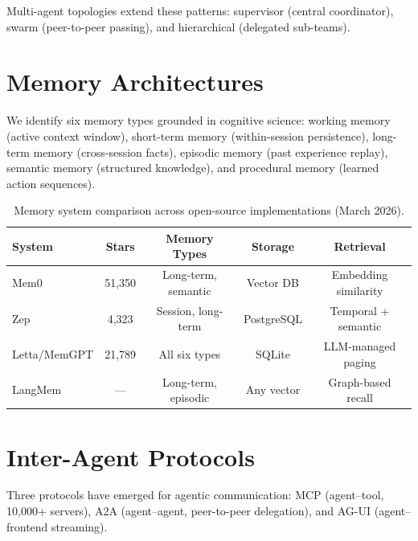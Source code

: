 \documentclass[sn-basic]{sn-jnl}
\theoremstyle{definition}
\begin{document}
Multi-agent topologies extend these patterns: supervisor (central coordinator), swarm (peer-to-peer passing), and hierarchical (delegated sub-teams).

\section{Memory Architectures}\label{sec:memory}

We identify six memory types grounded in cognitive science: working memory (active context window), short-term memory (within-session persistence), long-term memory (cross-session facts), episodic memory (past experience replay), semantic memory (structured knowledge), and procedural memory (learned action sequences).

\begin{table}[ht]
\centering
\caption{Memory system comparison across open-source implementations (March 2026).}
\label{tab:memory}
\begin{tabular}{lcccc}
\toprule
\textbf{System} & \textbf{Stars} & \textbf{Memory Types} & \textbf{Storage} & \textbf{Retrieval} \\
\midrule
Mem0         & 51,350 & Long-term, semantic  & Vector DB  & Embedding similarity \\
Zep          & 4,323  & Session, long-term   & PostgreSQL & Temporal + semantic \\
Letta/MemGPT & 21,789 & All six types        & SQLite     & LLM-managed paging \\
LangMem      & ---    & Long-term, episodic  & Any vector & Graph-based recall \\
\bottomrule
\end{tabular}
\end{table}

\section{Inter-Agent Protocols}\label{sec:protocols}

Three protocols have emerged for agentic communication: MCP \citep{anthropic2024mcp} (agent--tool, 10,000+ servers), A2A \citep{google2024a2a} (agent--agent, peer-to-peer delegation), and AG-UI \citep{copilotkit2024agui} (agent--frontend streaming).
\end{document}
